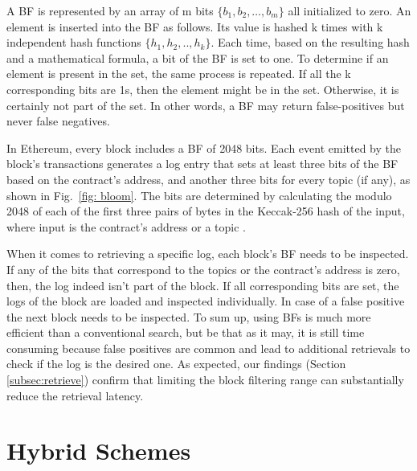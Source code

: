 A BF is represented by an array of m bits $\{b_1, b_2,…, b_m\}$ all initialized to zero. An element is inserted into the BF as follows. Its value is hashed k times with k independent hash functions $\{h_1, h_2,.., h_k\}$. Each time, based on the resulting hash and a mathematical formula, a bit of the BF is set to one. To determine if an element is present in the set, the same process is repeated. If all the k corresponding bits are 1s, then the element might be in the set. Otherwise, it is certainly not part of the set. In other words, a BF may return false-positives but never false negatives.

In Ethereum, every block includes a BF of 2048 bits. Each event emitted by the block’s transactions generates a log entry that sets at least three bits of the BF based on the contract’s address, and another three bits for every topic (if any), as shown in Fig.~\ref{fig: bloom}. The bits are determined by calculating the modulo 2048 of each of the first three pairs of bytes in the Keccak-256 hash of the input, where input is the contract’s address or a topic  \citep{wood_2014}.

When it comes to retrieving a specific log, each block’s BF needs to be inspected. If any of the bits that correspond to the topics or the contract’s address is zero, then, the log indeed isn’t part of the block. If all corresponding bits are set, the logs of the block are loaded and inspected individually. In case of a false positive the next block needs to be inspected.
To sum up, using BFs is much more efficient than a conventional search, but be that as it may, it is still time consuming because false positives are common and lead to additional retrievals to check if the log is the desired one. As expected, our findings (Section \ref{subsec:retrieve}) confirm that limiting the block filtering range can substantially reduce the retrieval latency.

\section{Hybrid Schemes}\label{sec:}
